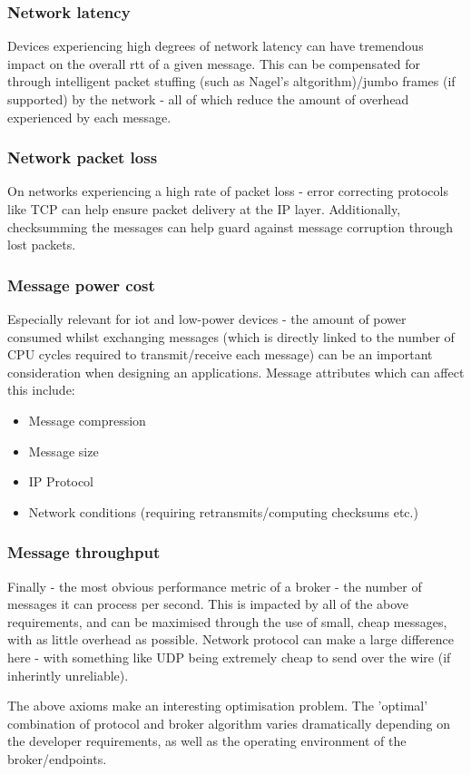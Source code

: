 \subsubsection{Network latency}
\label{subs:Network latency}

Devices experiencing high degrees of network latency can have tremendous impact
on the overall \gls{rtt} of a given message. This can be compensated for through
intelligent packet stuffing (such as Nagel's altgorithm)/jumbo frames (if supported)
by the network - all of which reduce the amount of overhead experienced by each
message.

\subsubsection{Network packet loss}
\label{subs:Network packet loss}

On networks experiencing a high rate of packet loss - error correcting protocols
like TCP can help ensure packet delivery at the IP layer. Additionally,
checksumming the messages can help guard against message corruption through lost
packets.

\subsubsection{Message power cost}
\label{subs:Message power cost}

Especially relevant for \gls{iot} and low-power devices - the amount of power
consumed whilst exchanging messages (which is directly linked to the number of
CPU cycles required to transmit/receive each message) can be an important
consideration when designing an applications. Message attributes which can
affect this include:

\begin{itemize}
  \item Message compression
  \item Message size
  \item IP Protocol
  \item Network conditions (requiring retransmits/computing checksums etc.)
\end{itemize}

\subsubsection{Message throughput}
\label{subs:Message throughput}

Finally - the most obvious performance metric of a broker - the number of messages
it can process per second. This is impacted by all of the above requirements,
and can be maximised through the use of small, cheap messages, with as little
overhead as possible. Network protocol can make a large difference here - with
something like UDP being extremely cheap to send over the wire
(if inherintly unreliable).

The above axioms make an interesting optimisation problem. The 'optimal' combination
of protocol and broker algorithm varies dramatically depending on the developer
requirements, as well as the operating environment of the broker/endpoints.
